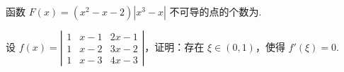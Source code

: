 	\begin{ti}
		函数 $F(x) = \left( x^{2} - x - 2 \right)\left| x^{3} - x \right|$ 不可导的点的个数为\kuo.
		
	\end{ti}

	\begin{ti}
		设 $f(x) = \left| \begin{smallmatrix}
			1 & x - 1 & 2 x - 1\\
			1 & x - 2 & 3 x - 2\\
			1 & x - 3 & 4 x - 3
		\end{smallmatrix} \right|$，证明：存在 $\xi \in (0,1)$，使得 $f'(\xi) = 0$.
	\end{ti}